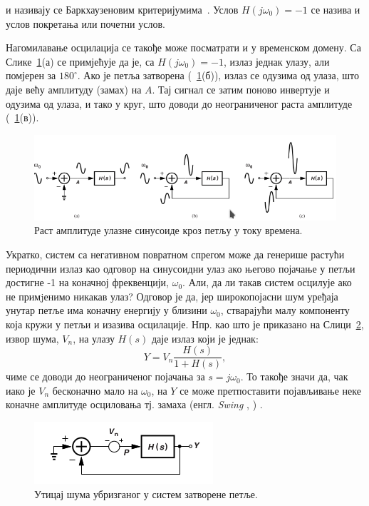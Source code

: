 \documentclass[master]{finthesis}
\makeatletter
\newcommand*{\engl}[2][\@empty]{%
    \edef\theacronym{#1}%
    (енгл. \foreignlanguage{english}{\emph{#2}%
    \ifx\theacronym\@empty \else , #1\fi})%
}
\makeatother
\begin{document}
и називају се Баркхаузеновим критеријумима~\cite{Razavi:PLL_CMOS_2020}. Услов $H(j\omega_{0})=-1$ се назива и услов покретања или почетни услов. \par
Нагомилавање осцилација се такође може посматрати и у временском домену. Са Слике~\ref{osc_feedback_5}(а) се примјећује да је, са $H(j\omega_{0})=-1$, излаз једнак улазу, али помјерен за $180^{\circ}$. Ако је петља затворена (\figurename~\ref{osc_feedback_5}(б)), излаз се одузима од улаза, што даје већу амплитуду (замах) на $A$. Тај сигнал се затим поново инвертује и одузима од улаза, и тако у круг, што доводи до неограниченог раста амплитуде (\figurename~\ref{osc_feedback_5}(в)). \par
\begin{figure}[!ht]
	 \centering
	 \includegraphics[scale=0.65]{slike/osc_feedback_5.png}
	 \caption{Раст амплитуде улазне синусоиде кроз петљу у току времена.}
	 \label{osc_feedback_5}
\end{figure}
Укратко, систем са негативном повратном спрегом може да генерише растући периодични излаз као одговор на синусоидни улаз ако његово појачање у петљи достигне -1 на коначној фреквенцији, $\omega_{0}$. Али, да ли такав систем осцилује ако не примjенимо никакав улаз? Одговор је да, јер широкопојасни шум уређаја унутар петље има коначну енергију у близини $\omega_{0}$, стварајући малу компоненту која кружи у петљи и изазива осцилације. Нпр. као што је приказано на Слици~\ref{osc_feedback_6}, извор шума, $V_{n}$, на улазу $H(s)$ даје излаз који је једнак:
\begin{equation} 
	\label{osc_feedback_eq_8}
	Y = V_{n}\frac{H(s)}{1+H(s)},
\end{equation}
чиме се доводи до неограниченог појачања за $s=j\omega_{0}$. То такође значи да, чак иако је $V_{n}$ бесконачно мало на $\omega_{0}$, на $Y$ се може претпоставити појављивање неке коначне амплитуде осциловања тј. замаха \engl{Swing}.

\begin{figure}[!ht]
	 \centering
	 \includegraphics[scale=0.8]{slike/osc_feedback_6.png}
	 \caption{Утицај шума убризганог у систем затворене петље.}
	 \label{osc_feedback_6}
\end{figure}
\end{document}
